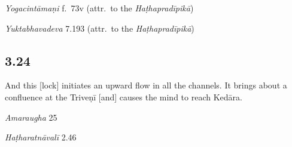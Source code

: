\begin{ekdosis}
\begin{testimonia}[hp03_023]
\emph{Yogacintāmaṇi} f.~73v (attr.~to the \emph{Haṭhapradīpikā})
\begin{versinnote}
\end{versinnote}

\emph{Yuktabhavadeva} 7.193 (attr.~to the \emph{Haṭhapradīpikā})
\begin{versinnote}
\end{versinnote}
\end{testimonia}


\subsection*{3.24}
\begin{translation}[hp03_024]
And this [lock] initiates an upward flow in all the channels. It brings about a confluence at the Triveṇī [and] causes the mind to reach Kedāra.
\end{translation}

\begin{sources}[hp03_024]
\emph{Amaraugha} 25
\begin{versinnote}
\end{versinnote}
\end{sources}

\begin{testimonia}[hp03_024]
\emph{Haṭharatnāvalī} 2.46
\begin{versinnote}
\end{versinnote}


\end{testimonia}
\end{ekdosis}
